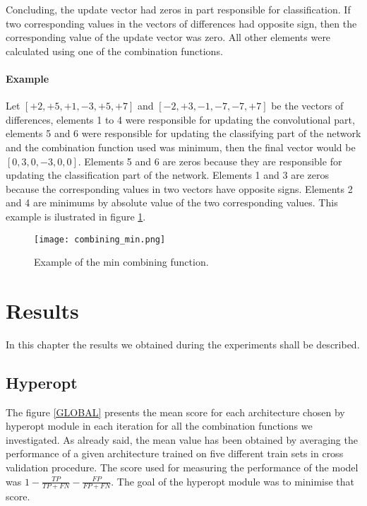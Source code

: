 \documentclass[a4paper,10pt]{report}
\begin{document}
      Concluding, the update vector had zeros in part responsible for classification. If two corresponding values in the vectors of differences had opposite sign, then the corresponding value of the update vector was zero. All other elements were calculated using one of the combination functions. 
      
      \subsubsection{Example}
      Let $[+2, +5, +1, -3, +5, +7]$ and $[-2, +3, -1, -7, -7, +7]$ be the vectors of differences, elements 1 to 4 were responsible for updating the convolutional part, elements 5 and 6 were responsible for updating the classifying part of the network and the combination function used was minimum, then the final vector would be $[0, 3, 0, -3, 0, 0]$. Elements 5 and 6 are zeros because they are responsible for updating the classification part of the network. Elements 1 and 3 are zeros because the corresponding values in two vectors have opposite signs. Elements 2 and 4 are minimums by absolute value of the two corresponding values. This example is ilustrated in figure \ref{fig:combining}. 
      
      \begin{figure}[h!]
	  \centering
	  \texttt{[image: combining\_min.png]}
	  \caption{Example of the min combining function.}
	  \label{fig:combining}
	\end{figure} 
	
   \chapter{Results} %
    In this chapter the results we obtained during the experiments shall be described.
   
   \section{Hyperopt}
   
    The figure \ref{GLOBAL} presents the mean score for each architecture chosen by hyperopt module in each iteration for all the combination functions we investigated. As already said, the mean value has been obtained by averaging the performance of a given architecture trained on five different train sets in cross validation procedure. The score used for measuring the performance of the model was $1-\frac{TP}{TP + FN} - \frac{FP}{FP + FN}$. The goal of the hyperopt module was to minimise that score.
    
\end{document}

